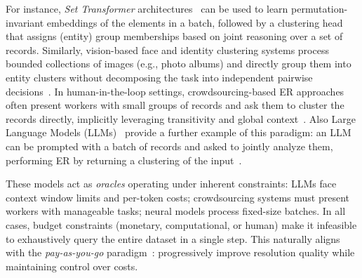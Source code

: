 \documentclass[sigconf, nonacm]{acmart}
\newtheorem{example}{Example}
\begin{document}
For instance, \emph{Set Transformer} architectures~\cite{DBLP:conf/icml/LeeLKKCT19} can be used to learn permutation-invariant embeddings of the elements in a batch, followed by a clustering head that assigns (entity) group memberships based on joint reasoning over a set of records.
Similarly, vision-based face and identity clustering systems process bounded collections of images (e.g., photo albums) and directly group them into entity clusters without decomposing the task into independent pairwise decisions~\cite{DBLP:conf/cvpr/SchroffKP15}.
In human-in-the-loop settings, crowdsourcing-based ER approaches often present workers with small groups of records and ask them to cluster the records directly, implicitly leveraging transitivity and global context~\cite{waldo, crowder}.
Also Large Language Models (LLMs)~\cite{DBLP:journals/corr/abs-2203-02155} provide a further example of this paradigm:
an LLM can be prompted with a batch of records and asked to jointly analyze them, performing ER by returning a clustering of the input~\cite{DBLP:conf/coling/WangCLCHSWZ25}.

These models act as \emph{oracles} operating under inherent constraints: LLMs face context window limits and per-token costs; crowdsourcing systems must present workers with manageable tasks; neural models process fixed-size batches. 
In all cases, budget constraints (monetary, computational, or human) make it infeasible to exhaustively query the entire dataset in a single step.
This naturally aligns with the \emph{pay-as-you-go} paradigm~\cite{DBLP:journals/tkde/WhangMG13}: progressively improve resolution quality while maintaining control over costs.



\end{document}
